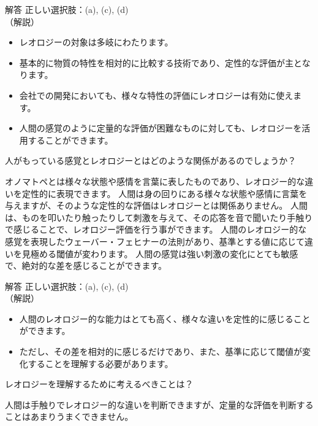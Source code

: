 \documentclass[uplatex,dvipdfmx,a4paper,11pt]{jsarticle}
\begin{document}
\begin{qlist}
    \vspace{3mm}
    \begin{itembox}[l]{解答}
        正しい選択肢：(a), (c), (d)\\
        （解説）
        \begin{itemize}
            \item レオロジーの対象は多岐にわたります。
            \item 基本的に物質の特性を相対的に比較する技術であり、定性的な評価が主となります。
            \item 会社での開発においても、様々な特性の評価にレオロジーは有効に使えます。
            \item 人間の感覚のように定量的な評価が困難なものに対しても、レオロジーを活用することができます。
        \end{itemize}
    \end{itembox}
	\qitem 人がもっている感覚とレオロジーとはどのような関係があるのでしょうか？
		\begin{qlist2}
            \qitem オノマトペとは様々な状態や感情を言葉に表したものであり、レオロジー的な違いを定性的に表現できます。
            \qitem 人間は身の回りにある様々な状態や感情に言葉を与えますが、そのような定性的な評価はレオロジーとは関係ありません。
			\qitem 人間は、ものを叩いたり触ったりして刺激を与えて、その応答を音で聞いたり手触りで感じることで、レオロジー評価を行う事ができます。
			\qitem 人間のレオロジー的な感覚を表現したウェーバー・フェヒナーの法則があり、基準とする値に応じて違いを見極める閾値が変わります。
            \qitem 人間の感覚は強い刺激の変化にとても敏感で、絶対的な差を感じることができます。
    \end{qlist2}
    \vspace{3mm}
    \begin{itembox}[l]{解答}
        正しい選択肢：(a), (c), (d)\\
        （解説）
        \begin{itemize}
            \item 人間のレオロジー的な能力はとても高く、様々な違いを定性的に感じることができます。
            \item ただし、その差を相対的に感じるだけであり、また、基準に応じて閾値が変化することを理解する必要があります。
        \end{itemize}
    \end{itembox}
	\qitem レオロジーを理解するために考えるべきことは？
		\begin{qlist2}
			\qitem 人間は手触りでレオロジー的な違いを判断できますが、定量的な評価を判断することはあまりうまくできません。

\end{qlist2}
\end{qlist}
\end{document}
